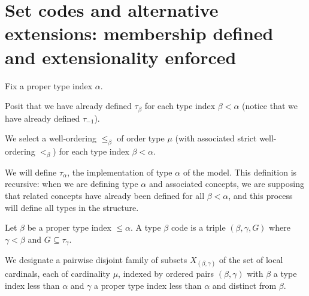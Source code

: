 \section{Set codes and alternative extensions:  membership defined and extensionality enforced}

\begin{definition}
\label {def:alpha}
Fix a proper type index $\alpha$.
\end{definition}

\begin{definition}
\label {def:oldtau}    
Posit that we have already defined $\tau_\beta$ for each type index $\beta<\alpha$ (notice that we have already defined $\tau_{-1}$).
\end{definition}

\begin{definition}
\label {def:typewords}    
We select a well-ordering $\leq_\beta$ of order type $\mu$ (with associated strict well-ordering $<_\beta$) for each type index $\beta<\alpha$.
\end{definition}

We will define $\tau_{\alpha}$, the implementation of type $\alpha$ of the model.  This definition is recursive:  when we are defining type $\alpha$ and associated concepts, we are supposing that related concepts have already been defined for all $\beta<\alpha$, and this process will define all types in the structure.

\begin{definition}
\label {codes}    
Let $\beta$ be a proper type index $\leq \alpha$.
A type $\beta$ code is a triple $(\beta,\gamma,G)$ where $\gamma<\beta$ and $G \subseteq \tau_{\gamma}$.
\end{definition}







\begin{definition}
\label {def:ftargets}      
We designate a pairwise disjoint family of subsets $X_{(\beta,\gamma)}$ of the set of local cardinals, each of cardinality $\mu$, indexed by ordered pairs $(\beta,\gamma)$ with $\beta$ a type index less than $\alpha$ and $\gamma$ a proper type index less than $\alpha$ and distinct from $\beta$.
\end{definition}

